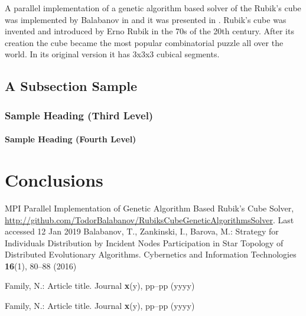\documentclass[runningheads]{llncs}
\begin{document}
A parallel implementation of a genetic algorithm based solver of the Rubik's cube was implemented by Balabanov in \cite{balabanov01} and it was presented in \cite{balabanov02}. Rubik's cube was invented and introduced by Erno Rubik in the 70s of the 20th century. After its creation the cube became the most popular combinatorial puzzle all over the world. In its original version it has 3x3x3 cubical segments. 

\subsection{A Subsection Sample}

\subsubsection{Sample Heading (Third Level)}

\paragraph{Sample Heading (Fourth Level)}

\section{Conclusions}

\cite{ref_author3,ref_author4}

\begin{thebibliography}{8}
MPI Parallel Implementation of Genetic Algorithm Based Rubik’s Cube Solver, \url{http://github.com/TodorBalabanov/RubiksCubeGeneticAlgorithmsSolver}. Last accessed 12 Jan 2019
Balabanov, T., Zankinski, I., Barova, M.: Strategy for Individuals Distribution by Incident Nodes Participation in Star Topology of Distributed Evolutionary Algorithms. Cybernetics and Information Technologies \textbf{16}(1), 80--88 (2016)

Family, N.: Article title. Journal \textbf{x}(y), pp--pp (yyyy)

Family, N.: Article title. Journal \textbf{x}(y), pp--pp (yyyy)
\end{thebibliography}
\end{document}
